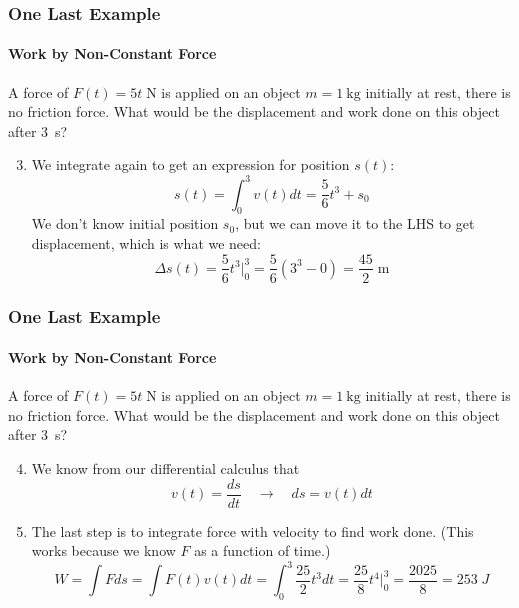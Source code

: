 \documentclass[12pt,compress,aspectratio=169]{beamer}
\begin{document}
\begin{frame}
  \frametitle{One Last Example}
  \framesubtitle{Work by Non-Constant Force}

  A force of $F(t)=5t\;\si{\N}$ is applied on an object $m=\SI{1}{\kg}$ initially
  at rest, there is no friction force. What would be the displacement and work
  done on this object after \SI{3}{\s}?

  \begin{enumerate}
    \setcounter{enumi}{2}
  \item We integrate again to get an expression for position $s(t)$:
    \begin{displaymath}
      s(t)=\int_0^3 v(t)dt=\frac{5}{6}t^3+s_0
    \end{displaymath}
    We don't know initial position $s_0$, but we can move it to the
    LHS to get displacement, which is what we need:
    \begin{displaymath}
      \Delta s(t)=\frac{5}{6}t^3\Big|^3_0=\frac{5}{6}\left(3^3-0\right)=
      \frac{45}{2}\;\si{\metre}
    \end{displaymath}
  \end{enumerate}
\end{frame}

\begin{frame}
  \frametitle{One Last Example}
  \framesubtitle{Work by Non-Constant Force}

  A force of $F(t)=5t\;\si{\N}$ is applied on an object $m=\SI{1}{\kg}$
  initially at rest, there is no friction force. What would be the displacement
  and work done on this object after \SI{3}{\s}?

  \begin{enumerate}
    \setcounter{enumi}{3}
  \item We know from our differential calculus that
    \begin{displaymath}
      v(t)=\frac{ds}{dt}\quad\longrightarrow\quad ds=v(t)dt
    \end{displaymath}
  \item The last step is to integrate force with velocity to find work done.
    (This works because we know $F$ as a function of time.)
    \begin{displaymath}
      W=\int Fds=\int F(t)v(t)dt =\int_0^3\frac{25}{2}t^3dt=\frac{25}{8}t^4\Big|^3_0
      =\frac{2025}{8}=\boxed{253\;\si{J}}
    \end{displaymath}
  \end{enumerate}
\end{frame}
\end{document}
